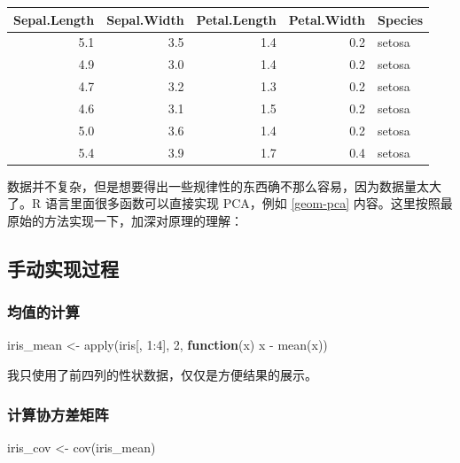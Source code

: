 \documentclass[
]{krantz}
\makeatletter
\newenvironment{Shaded}{\begin{snugshade}}{\end{snugshade}}
\newcommand{\ControlFlowTok}[1]{\textcolor[rgb]{0.13,0.29,0.53}{\textbf{#1}}}
\newcommand{\DecValTok}[1]{\textcolor[rgb]{0.00,0.00,0.81}{#1}}
\newcommand{\FunctionTok}[1]{\textcolor[rgb]{0.00,0.00,0.00}{#1}}
\newcommand{\NormalTok}[1]{#1}
\newcommand{\OtherTok}[1]{\textcolor[rgb]{0.56,0.35,0.01}{#1}}
\newcommand{\SpecialCharTok}[1]{\textcolor[rgb]{0.00,0.00,0.00}{#1}}
\newenvironment{kframe}{%
\medskip{}
\setlength{\fboxsep}{.8em}
 \def\at@end@of@kframe{}%
 \ifinner\ifhmode%
  \def\at@end@of@kframe{\end{minipage}}%
  \begin{minipage}{\columnwidth}%
 \fi\fi%
 \def\FrameCommand##1{\hskip\@totalleftmargin \hskip-\fboxsep
 \colorbox{shadecolor}{##1}\hskip-\fboxsep
     \hskip-\linewidth \hskip-\@totalleftmargin \hskip\columnwidth}%
 \MakeFramed {\advance\hsize-\width
   \@totalleftmargin\z@ \linewidth\hsize
   \@setminipage}}%
 {\par\unskip\endMakeFramed%
 \at@end@of@kframe}
\renewenvironment{Shaded}{\begin{kframe}}{\end{kframe}}
\makeatother
\begin{document}
\begin{tabular}{r|r|r|r|l}
\hline
Sepal.Length & Sepal.Width & Petal.Length & Petal.Width & Species\\
\hline
5.1 & 3.5 & 1.4 & 0.2 & setosa\\
\hline
4.9 & 3.0 & 1.4 & 0.2 & setosa\\
\hline
4.7 & 3.2 & 1.3 & 0.2 & setosa\\
\hline
4.6 & 3.1 & 1.5 & 0.2 & setosa\\
\hline
5.0 & 3.6 & 1.4 & 0.2 & setosa\\
\hline
5.4 & 3.9 & 1.7 & 0.4 & setosa\\
\hline
\end{tabular}

数据并不复杂，但是想要得出一些规律性的东西确不那么容易，因为数据量太大了。R 语言里面很多函数可以直接实现 PCA，例如 \ref{geom-pca} 内容。这里按照最原始的方法实现一下，加深对原理的理解：

\hypertarget{man_pca}{%
\subsection{手动实现过程}\label{man_pca}}

\hypertarget{av_val}{%
\subsubsection{均值的计算}\label{av_val}}

\begin{Shaded}
\begin{Highlighting}[]
\NormalTok{iris\_mean }\OtherTok{\textless{}{-}} \FunctionTok{apply}\NormalTok{(iris[, }\DecValTok{1}\SpecialCharTok{:}\DecValTok{4}\NormalTok{], }\DecValTok{2}\NormalTok{, }\ControlFlowTok{function}\NormalTok{(x) x }\SpecialCharTok{{-}} \FunctionTok{mean}\NormalTok{(x))}
\end{Highlighting}
\end{Shaded}

我只使用了前四列的性状数据，仅仅是方便结果的展示。

\hypertarget{cov_val}{%
\subsubsection{计算协方差矩阵}\label{cov_val}}

\begin{Shaded}
\begin{Highlighting}[]
\NormalTok{iris\_cov }\OtherTok{\textless{}{-}} \FunctionTok{cov}\NormalTok{(iris\_mean)}
\end{Highlighting}
\end{Shaded}
\end{document}
